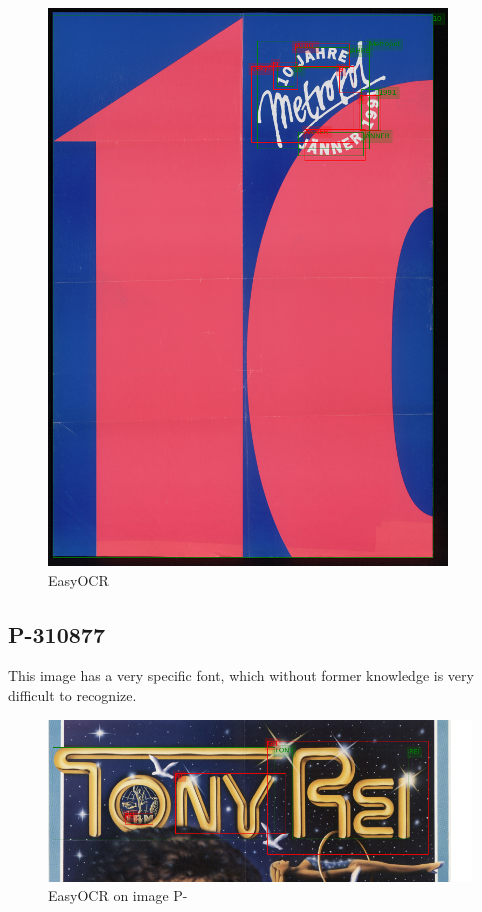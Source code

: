 \begin{figure}[hbtp!]
    \centering
    \includegraphics[scale=0.8]{obrazky/plakaty/result_easyOCR_vienna1_split_tuning_special_sensitive-55.png}
    \caption{EasyOCR}
    \label{Im5:ex:easy}
\end{figure}

\subsection*{P-310877}
This image has a very specific font, which without former knowledge is very difficult to recognize.

\begin{figure}[hbtp!]
    \centering
    \includegraphics[width=\textwidth]{obrazky/plakaty/result_easyOCR_vienna2_nosplit_notuning_nocorrection-70.png}
    \caption{EasyOCR on image P-}
    \label{Im6:ex:easy}
\end{figure}


